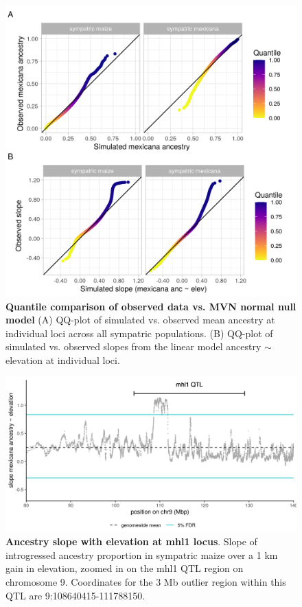 \begin{figure}[ht]
\includegraphics[width=\textwidth]{chapter2/figures/QQ.png}
\caption{\color{Gray} \textbf{Quantile comparison of observed data vs. MVN normal null model} (A) QQ-plot of simulated vs. observed mean ancestry at individual loci across all sympatric populations. (B) QQ-plot of simulated vs. observed slopes from the linear model \mexicana ancestry $\sim$ elevation at individual loci.}
\label{QQ}
\end{figure}

\begin{figure}[ht]
\includegraphics[width=\textwidth]{chapter2/figures/mhl1_inv_ancestry.png}
\caption{\color{Gray} \textbf{Ancestry slope with elevation at mhl1 locus}. Slope of introgressed \mexicana ancestry proportion in sympatric maize over a 1 km gain in elevation, zoomed in on the mhl1 QTL region on chromosome 9. Coordinates for the 3 Mb outlier region within this QTL are 9:108640415-111788150.}
\label{mhl1_slopes}
\end{figure}

